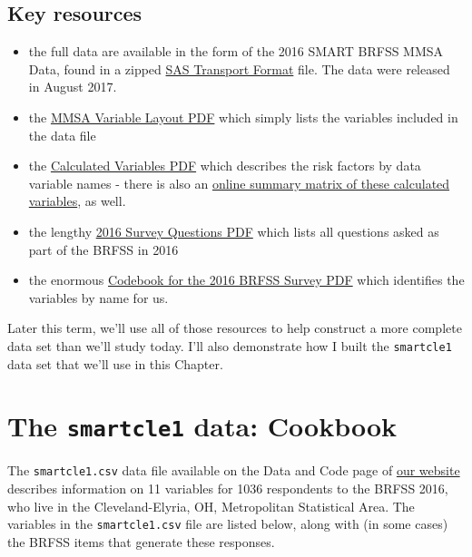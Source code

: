 \documentclass[]{book}
\providecommand{\tightlist}{%
  \setlength{\itemsep}{0pt}\setlength{\parskip}{0pt}}
\theoremstyle{definition}
\theoremstyle{definition}
\theoremstyle{definition}
\theoremstyle{remark}
\begin{document}
\subsection{Key resources}\label{key-resources}

\begin{itemize}
\tightlist
\item
  the full data are available in the form of the 2016 SMART BRFSS MMSA
  Data, found in a zipped
  \href{https://www.cdc.gov/brfss/smart/2016/MMSA2016_XPT.zip}{SAS
  Transport Format} file. The data were released in August 2017.
\item
  the
  \href{https://www.cdc.gov/brfss/smart/2016/mmsa_varlayout_16.pdf}{MMSA
  Variable Layout PDF} which simply lists the variables included in the
  data file
\item
  the
  \href{https://www.cdc.gov/brfss/annual_data/2016/pdf/2016_calculated_variables_version4.pdf}{Calculated
  Variables PDF} which describes the risk factors by data variable names
  - there is also an
  \href{https://www.cdc.gov/brfss/annual_data/2016/Summary_Matrix_16.html}{online
  summary matrix of these calculated variables}, as well.
\item
  the lengthy
  \href{https://www.cdc.gov/brfss/questionnaires/pdf-ques/2016_BRFSS_Questionnaire_FINAL.pdf}{2016
  Survey Questions PDF} which lists all questions asked as part of the
  BRFSS in 2016
\item
  the enormous
  \href{https://www.cdc.gov/brfss/annual_data/2016/pdf/codebook16_llcp.pdf}{Codebook
  for the 2016 BRFSS Survey PDF} which identifies the variables by name
  for us.
\end{itemize}

Later this term, we'll use all of those resources to help construct a
more complete data set than we'll study today. I'll also demonstrate how
I built the \texttt{smartcle1} data set that we'll use in this Chapter.

\section{\texorpdfstring{The \texttt{smartcle1} data:
Cookbook}{The smartcle1 data: Cookbook}}\label{the-smartcle1-data-cookbook}

The \texttt{smartcle1.csv} data file available on the Data and Code page
of \href{https://github.com/THOMASELOVE/432-2018}{our website} describes
information on 11 variables for 1036 respondents to the BRFSS 2016, who
live in the Cleveland-Elyria, OH, Metropolitan Statistical Area. The
variables in the \texttt{smartcle1.csv} file are listed below, along
with (in some cases) the BRFSS items that generate these responses.
\end{document}
